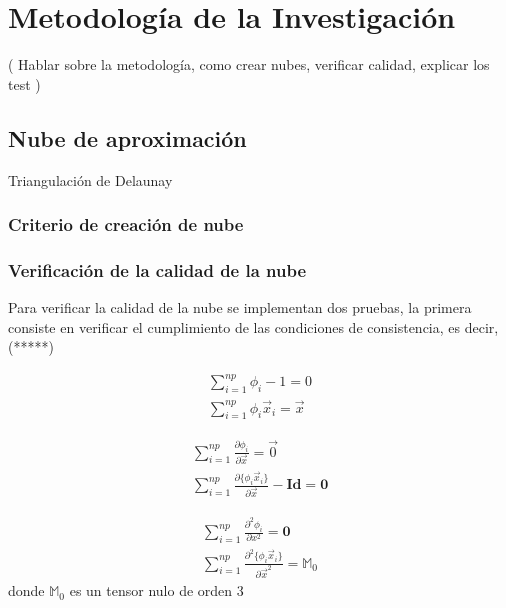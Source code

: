 \chapter{Metodología de la Investigación}

( Hablar sobre la metodología, como crear nubes, verificar calidad, explicar los test )

\section{Nube de aproximación}

Triangulación de Delaunay

\subsection{Criterio de creación de nube}

\subsection{Verificación de la calidad de la nube}
Para verificar la calidad de la nube se implementan dos pruebas, la primera consiste en verificar el cumplimiento de las condiciones de consistencia, es decir, (*****)

\begin{eqnarray} \label{eq:d0_consistency_conditions}
    \sum_{i=1}^{np} \phi_i - 1 = 0 \\
    \sum_{i=1}^{np} \phi_i \vec{x}_i = \vec{x}
\end{eqnarray}

\begin{eqnarray} \label{eq:d1_consistency_conditions}
    \sum_{i=1}^{np} \frac{\partial{\phi_i}}{\partial{\vec{x}}} = \vec{0} \\
    \sum_{i=1}^{np} \frac{\partial\{\phi_i\vec{x}_i\}}{\partial\vec{x}} - \textbf{Id} = \textbf{0} 
\end{eqnarray}

\begin{eqnarray} \label{eq:d2_consistency_conditions}
    \sum_{i=1}^{np} \frac{\partial^2{\phi_i}}{\partial x^2} = \textbf{0} \\
    \sum_{i=1}^{np} \frac{\partial^2\{\phi_i\vec{x}_i\}}{\partial\vec{x}^2} = \mathbb{M}_0 
\end{eqnarray}
donde $\mathbb{M}_0$ es un tensor nulo de orden 3

